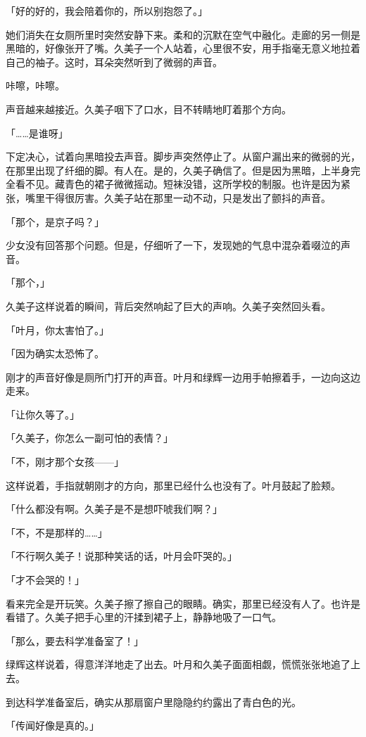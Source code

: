 \documentclass[UTF8]{ctexart}
\begin{document}
    「好的好的，我会陪着你的，所以别抱怨了。」

    她们消失在女厕所里时突然安静下来。柔和的沉默在空气中融化。走廊的另一侧是黑暗的，好像张开了嘴。久美子一个人站着，心里很不安，用手指毫无意义地拉着自己的袖子。这时，耳朵突然听到了微弱的声音。

    咔嚓，咔嚓。

    声音越来越接近。久美子咽下了口水，目不转睛地盯着那个方向。

    「……是谁呀」

    下定决心，试着向黑暗投去声音。脚步声突然停止了。从窗户漏出来的微弱的光，在那里出现了纤细的脚。有人在。是的，久美子确信了。但是因为黑暗，上半身完全看不见。藏青色的裙子微微摇动。短袜没错，这所学校的制服。也许是因为紧张，嘴里干得很厉害。久美子站在那里一动不动，只是发出了颤抖的声音。

    「那个，是京子吗？」

    少女没有回答那个问题。但是，仔细听了一下，发现她的气息中混杂着啜泣的声音。

    「那个，」

    久美子这样说着的瞬间，背后突然响起了巨大的声响。久美子突然回头看。

    「叶月，你太害怕了。」

    「因为确实太恐怖了。

    刚才的声音好像是厕所门打开的声音。叶月和绿辉一边用手帕擦着手，一边向这边走来。

    「让你久等了。」

    「久美子，你怎么一副可怕的表情？」

    「不，刚才那个女孩——」

    这样说着，手指就朝刚才的方向，那里已经什么也没有了。叶月鼓起了脸颊。

    「什么都没有啊。久美子是不是想吓唬我们啊？」

    「不，不是那样的……」

    「不行啊久美子！说那种笑话的话，叶月会吓哭的。」

    「才不会哭的！」

    看来完全是开玩笑。久美子擦了擦自己的眼睛。确实，那里已经没有人了。也许是看错了。久美子把手心里的汗揉到裙子上，静静地吸了一口气。

    「那么，要去科学准备室了！」

    绿辉这样说着，得意洋洋地走了出去。叶月和久美子面面相觑，慌慌张张地追了上去。

    到达科学准备室后，确实从那扇窗户里隐隐约约露出了青白色的光。

    「传闻好像是真的。」
\end{document}
